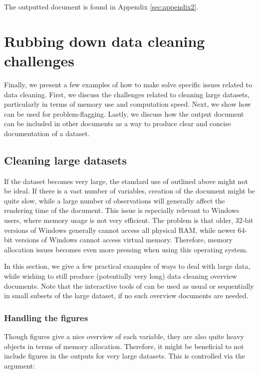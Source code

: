 \documentclass[article,shortnames]{jss}
\newcommand{\hl}[1]{\textcolor{magenta}{#1}}
\begin{document}
The outputted document is found in Appendix \ref{sec:appendix2}.

\section{Rubbing down data cleaning challenges}
\label{sec:specificExamples}

Finally, we present a few examples of how to make 
solve specific issues related to data cleaning. First, we discuss the
challenges related to cleaning large datasets, particularly in terms
of memory use and computation speed. Next, we show how 
can be used for problem-flagging. Lastly, we discuss how the
 output document can be included in other 
documents as a way to produce clear and concise documentation of a
dataset. %

\subsection{Cleaning large datasets}
If the dataset becomes very large, the standard use of 
outlined above might not be ideal. If there is a vast number of
variables, creation of the  document might be quite
slow, while a large number of observations will generally affect the
rendering time of the document. This issue is especially relevant to
Windows users, where memory usage is not very efficient. The problem is that older,
32-bit versions of Windows generally cannot access all physical RAM,
while newer 64-bit versions of Windows cannot access virtual memory. Therefore,
memory allocation issues becomes even more pressing when using this operating system.


In this section, we give a few
practical examples of ways to deal with large data, while wishing to
still produce (potentially very long) data cleaning overview
documents. Note that the interactive tools of  can be used
as usual or sequentially in small subsets of the large dataset, if no
such overview documents are needed.

\subsubsection{Handling the figures}
Though figures give a nice overview of each variable, they are also
quite heavy objects in terms of memory allocation. Therefore, it might
be beneficial to not include figures in the  outputs for
very large datasets. This is controlled via the  argument:
\end{document}
